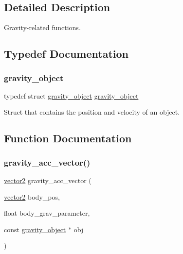\subsection{Detailed Description}
Gravity-\/related functions. 



\subsection{Typedef Documentation}
\mbox{\label{group__gravity_ga5aec6ca0c05d29e1a2708c89b0f27228}} 
\subsubsection{\texorpdfstring{gravity\+\_\+object}{gravity\_object}}
{\footnotesize\ttfamily typedef struct \hyperlink{structgravity__object}{gravity\+\_\+object}  \hyperlink{structgravity__object}{gravity\+\_\+object}}



Struct that contains the position and velocity of an object. 



\subsection{Function Documentation}
\mbox{\label{group__gravity_gadecebe4cd578161d35b325249079f7b9}} 
\subsubsection{\texorpdfstring{gravity\+\_\+acc\+\_\+vector()}{gravity\_acc\_vector()}}
{\footnotesize\ttfamily \hyperlink{structvector2}{vector2} gravity\+\_\+acc\+\_\+vector (\begin{DoxyParamCaption}\item[{\hyperlink{structvector2}{vector2}}]{body\+\_\+pos,  }\item[{float}]{body\+\_\+grav\+\_\+parameter,  }\item[{const \hyperlink{structgravity__object}{gravity\+\_\+object} $\ast$}]{obj }\end{DoxyParamCaption})}



